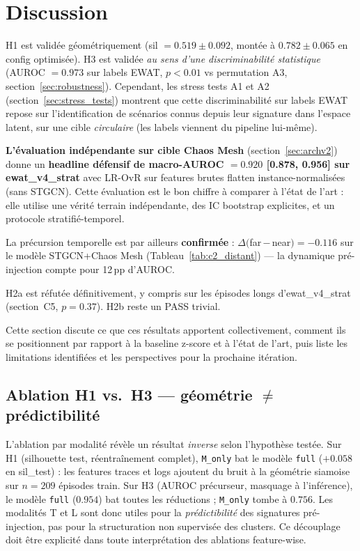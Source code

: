 
\section{Discussion}
\label{sec:discussion}

H1 est validée géométriquement (sil $= 0.519 \pm 0.092$, montée à $0.782 \pm 0.065$ en config
optimisée). H3 est validée \emph{au sens d'une discriminabilité statistique} (AUROC $= 0.973$
sur labels EWAT, $p < 0.01$ vs permutation A3, section~\ref{sec:robustness}). Cependant,
les stress tests A1 et A2 (section~\ref{sec:stress_tests}) montrent que cette discriminabilité
sur labels EWAT repose sur l'identification de scénarios connus depuis leur signature dans
l'espace latent, sur une cible \emph{circulaire} (les labels viennent du pipeline lui-même).

\textbf{L'évaluation indépendante sur cible Chaos Mesh} (section~\ref{sec:archv2}) donne
un \textbf{headline défensif de macro-AUROC $\mathbf{= 0.920}$ [0.878, 0.956] sur ewat\_v4\_strat}
avec LR-OvR sur features brutes flatten instance-normalisées (sans STGCN). Cette évaluation
est le bon chiffre à comparer à l'état de l'art : elle utilise une vérité terrain indépendante,
des IC bootstrap explicites, et un protocole stratifié-temporel.

La précursion temporelle est par ailleurs \textbf{confirmée} : $\Delta($far\,$-$\,near$) = -0.116$
sur le modèle STGCN+Chaos Mesh (Tableau~\ref{tab:c2_distant}) --- la dynamique pré-injection compte
pour 12\,pp d'AUROC.

H2a est réfutée définitivement, y compris sur les épisodes longs d'ewat\_v4\_strat (section~C5,
$p = 0.37$). H2b reste un PASS trivial.

Cette section discute ce que ces résultats apportent collectivement, comment ils se
positionnent par rapport à la baseline z-score et à l'état de l'art, puis liste
les limitations identifiées et les perspectives pour la prochaine itération.

\subsection{Ablation H1 vs.\ H3 --- géométrie $\neq$ prédictibilité}
\label{sec:ablation_h1_h3}

L'ablation par modalité révèle un résultat \emph{inverse} selon l'hypothèse testée.
Sur H1 (silhouette test, réentraînement complet), \texttt{M\_only} bat le modèle
\texttt{full} ($+0.058$ en sil\_test) : les features traces et logs ajoutent du bruit
à la géométrie siamoise sur $n=209$ épisodes train.
Sur H3 (AUROC précurseur, masquage à l'inférence), le modèle \texttt{full}
($0.954$) bat toutes les réductions ; \texttt{M\_only} tombe à $0.756$.
Les modalités T et L sont donc utiles pour la \emph{prédictibilité} des signatures
pré-injection, pas pour la structuration non supervisée des clusters.
Ce découplage doit être explicité dans toute interprétation des ablations feature-wise.

